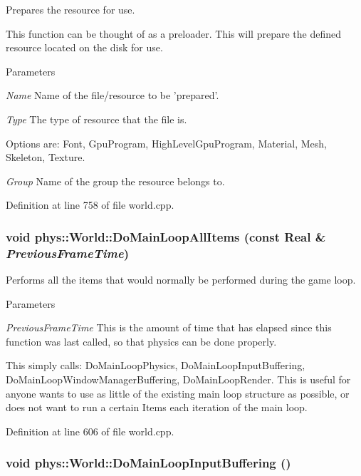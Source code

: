 Prepares the resource for use. 

This function can be thought of as a preloader. This will prepare the defined resource located on the disk for use. 
\begin{DoxyParams}{Parameters}
\item[{\em Name}]Name of the file/resource to be 'prepared'. \item[{\em Type}]The type of resource that the file is. \par
 Options are: Font, GpuProgram, HighLevelGpuProgram, Material, Mesh, Skeleton, Texture. \item[{\em Group}]Name of the group the resource belongs to. \end{DoxyParams}


Definition at line 758 of file world.cpp.

\hypertarget{classphys_1_1World_a25c2583425bfe3d0d2bfce1093f0175e}{
\subsubsection[{DoMainLoopAllItems}]{\setlength{\rightskip}{0pt plus 5cm}void phys::World::DoMainLoopAllItems (const {\bf Real} \& {\em PreviousFrameTime})}}
\label{da/ddf/classphys_1_1World_a25c2583425bfe3d0d2bfce1093f0175e}


Performs all the items that would normally be performed during the game loop. 


\begin{DoxyParams}{Parameters}
\item[{\em PreviousFrameTime}]This is the amount of time that has elapsed since this function was last called, so that physics can be done properly.\end{DoxyParams}
This simply calls: DoMainLoopPhysics, DoMainLoopInputBuffering, DoMainLoopWindowManagerBuffering, DoMainLoopRender. This is useful for anyone wants to use as little of the existing main loop structure as possible, or does not want to run a certain Items each iteration of the main loop. 

Definition at line 606 of file world.cpp.

\hypertarget{classphys_1_1World_af4204b587fcc71e8313dd97d476378d6}{
\subsubsection[{DoMainLoopInputBuffering}]{\setlength{\rightskip}{0pt plus 5cm}void phys::World::DoMainLoopInputBuffering ()}}
\label{da/ddf/classphys_1_1World_af4204b587fcc71e8313dd97d476378d6}


